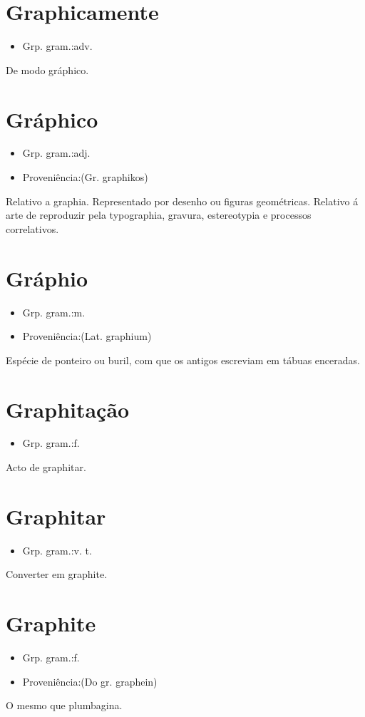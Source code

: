 \section{Graphicamente}
\begin{itemize}
\item {Grp. gram.:adv.}
\end{itemize}
De modo gráphico.
\section{Gráphico}
\begin{itemize}
\item {Grp. gram.:adj.}
\end{itemize}
\begin{itemize}
\item {Proveniência:(Gr. \textunderscore graphikos\textunderscore )}
\end{itemize}
Relativo a graphia.
Representado por desenho ou figuras geométricas.
Relativo á arte de reproduzir pela typographia, gravura, estereotypia e processos correlativos.
\section{Gráphio}
\begin{itemize}
\item {Grp. gram.:m.}
\end{itemize}
\begin{itemize}
\item {Proveniência:(Lat. \textunderscore graphium\textunderscore )}
\end{itemize}
Espécie de ponteiro ou buril, com que os antigos escreviam em tábuas enceradas.
\section{Graphitação}
\begin{itemize}
\item {Grp. gram.:f.}
\end{itemize}
Acto de graphitar.
\section{Graphitar}
\begin{itemize}
\item {Grp. gram.:v. t.}
\end{itemize}
Converter em graphite.
\section{Graphite}
\begin{itemize}
\item {Grp. gram.:f.}
\end{itemize}
\begin{itemize}
\item {Proveniência:(Do gr. \textunderscore graphein\textunderscore )}
\end{itemize}
O mesmo que \textunderscore plumbagina\textunderscore .
